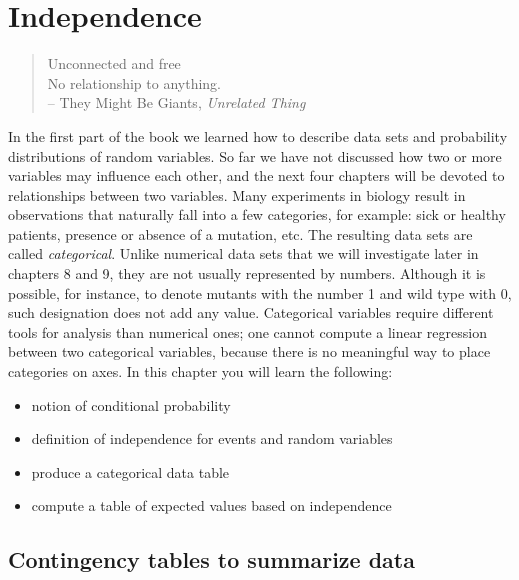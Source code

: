 \documentclass[
  letterpaper,
  DIV=11,
  numbers=noendperiod]{scrreprt}
\begin{document}

\hypertarget{independence}{%
\chapter{Independence}\label{independence}}

\begin{quote}
Unconnected and free\\
No relationship to anything.\\
-- They Might Be Giants, \emph{Unrelated Thing}
\end{quote}

In the first part of the book we learned how to describe data sets and
probability distributions of random variables. So far we have not
discussed how two or more variables may influence each other, and the
next four chapters will be devoted to relationships between two
variables. Many experiments in biology result in observations that
naturally fall into a few categories, for example: sick or healthy
patients, presence or absence of a mutation, etc. The resulting data
sets are called \emph{categorical}. Unlike numerical data sets that we
will investigate later in chapters 8 and 9, they are not usually
represented by numbers. Although it is possible, for instance, to denote
mutants with the number 1 and wild type with 0, such designation does
not add any value. Categorical variables require different tools for
analysis than numerical ones; one cannot compute a linear regression
between two categorical variables, because there is no meaningful way to
place categories on axes. In this chapter you will learn the following:

\begin{itemize}
\item
  notion of conditional probability
\item
  definition of independence for events and random variables
\item
  produce a categorical data table
\item
  compute a table of expected values based on independence
\end{itemize}

\hypertarget{contingency-tables-to-summarize-data}{%
\section{Contingency tables to summarize
data}\label{contingency-tables-to-summarize-data}}
\end{document}
